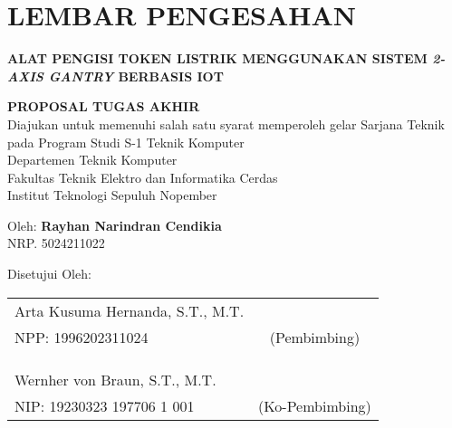 \chapter*{LEMBAR PENGESAHAN}

\thispagestyle{empty}

\begin{center}
  \textbf{ALAT PENGISI TOKEN LISTRIK MENGGUNAKAN SISTEM \emph{2-AXIS GANTRY} BERBASIS IOT}
\end{center}

\begingroup
\small

\begin{center}
  \textbf{PROPOSAL TUGAS AKHIR} \\
  Diajukan untuk memenuhi salah satu syarat memperoleh gelar
  Sarjana Teknik pada
  Program Studi S-1 Teknik Komputer \\
  Departemen Teknik Komputer \\
  Fakultas Teknik Elektro dan Informatika Cerdas \\
  Institut Teknologi Sepuluh Nopember
\end{center}

\begin{center}
  Oleh: \textbf{Rayhan Narindran Cendikia} \\
  NRP. 5024211022
\end{center}

\begin{center}
  Disetujui Oleh:
\end{center}

\vspace{10ex}

\begingroup
\setlength{\tabcolsep}{0pt}

\noindent
\begin{tabularx}{\textwidth}{X c}
  Arta Kusuma Hernanda, S.T., M.T.      &                 \\
  NPP: 1996202311024                    & (Pembimbing)    \\
                                        &                 \\
                                        &                 \\
                                        &                 \\
  Wernher von Braun, S.T., M.T.         &                 \\
  NIP: 19230323 197706 1 001            & (Ko-Pembimbing) \\
\end{tabularx}
\endgroup

